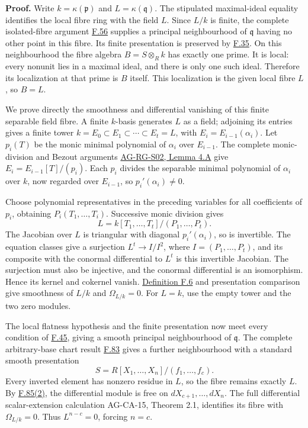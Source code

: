 \documentclass[11pt,a4paper,openany]{report}
\begin{document}
\textbf{Proof.} Write \(k=\kappa(\mathfrak p)\) and \(L=\kappa(\mathfrak q)\). The stipulated maximal-ideal equality identifies the local fibre ring with the field \(L\). Since \(L/k\) is finite, the complete isolated-fibre argument \hyperref[AG-RG-S05-algebra-lemma-isolated-point-fibre]{F.56} supplies a principal neighbourhood of \(\mathfrak q\) having no other point in this fibre. Its finite presentation is preserved by \hyperref[AG-RG-S05-algebra-lemma-cover-upstairs]{F.35}. On this neighbourhood the fibre algebra \(B=S\otimes_Rk\) has exactly one prime. It is local: every nonunit lies in a maximal ideal, and there is only one such ideal. Therefore its localization at that prime is \(B\) itself. This localization is the given local fibre \(L\), so \(B=L\).

We prove directly the smoothness and differential vanishing of this finite separable field fibre. A finite \(k\)-basis generates \(L\) as a field; adjoining its entries gives a finite tower \(k=E_0\subset E_1\subset\cdots\subset E_t=L\), with \(E_i=E_{i-1}(\alpha_i)\). Let \(p_i(T)\) be the monic minimal polynomial of \(\alpha_i\) over \(E_{i-1}\). The complete monic-division and Bezout arguments \href{https://github.com/KokunoYumeto/open-math-courses/blob/main/docs/courses/AG-RG/AG-RG-S02.md}{AG-RG-S02, Lemma 4.A} give \(E_i=E_{i-1}[T]/(p_i)\). Each \(p_i\) divides the separable minimal polynomial of \(\alpha_i\) over \(k\), now regarded over \(E_{i-1}\), so \(p_i'(\alpha_i)\ne0\).

Choose polynomial representatives in the preceding variables for all coefficients of \(p_i\), obtaining \(P_i(T_1,\ldots,T_i)\). Successive monic division gives \[L=k[T_1,\ldots,T_t]/(P_1,\ldots,P_t).\] The Jacobian over \(L\) is triangular with diagonal \(p_i'(\alpha_i)\), so is invertible. The equation classes give a surjection \(L^t\to I/I^2\), where \(I=(P_1,\ldots,P_t)\), and its composite with the conormal differential to \(L^t\) is this invertible Jacobian. The surjection must also be injective, and the conormal differential is an isomorphism. Hence its kernel and cokernel vanish. \hyperref[AG-RG-S05-algebra-definition-smooth]{Definition F.6} and presentation comparison give smoothness of \(L/k\) and \(\Omega_{L/k}=0\). For \(L=k\), use the empty tower and the two zero modules.

The local flatness hypothesis and the finite presentation now meet every condition of \hyperref[AG-RG-S05-algebra-lemma-flat-fibre-smooth]{F.45}, giving a smooth principal neighbourhood of \(\mathfrak q\). The complete arbitrary-base chart result \hyperref[AG-RG-S05-algebra-lemma-smooth-syntomic]{F.83} gives a further neighbourhood with a standard smooth presentation \[S=R[X_1,\ldots,X_n]/(f_1,\ldots,f_c).\] Every inverted element has nonzero residue in \(L\), so the fibre remains exactly \(L\). By \hyperref[AG-RG-S05-algebra-lemma-standard-smooth]{F.85(2)}, the differential module is free on \(dX_{c+1},\ldots,dX_n\). The full differential scalar-extension calculation AG-CA-15, Theorem 2.1, identifies its fibre with \(\Omega_{L/k}=0\). Thus \(L^{n-c}=0\), forcing \(n=c\).
\end{document}
